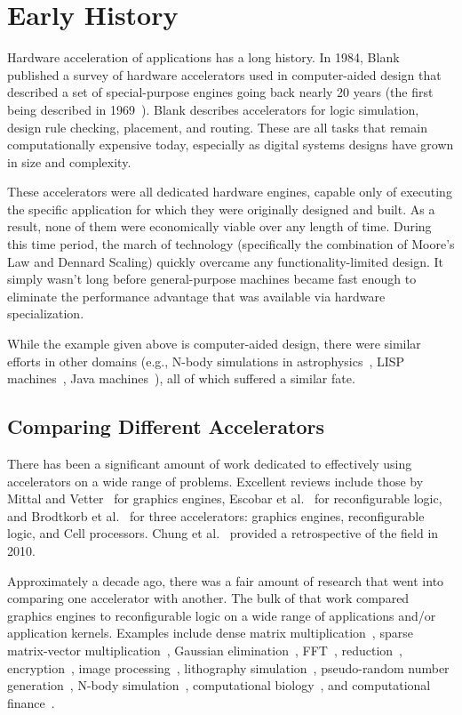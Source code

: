 \section{Early History}
\label{sec:history}

Hardware acceleration of applications has a long history.
In 1984, Blank~\cite{Blank84}
published a survey of hardware accelerators used in computer-aided design 
that described a set of special-purpose engines going back nearly 20 years
(the first being described in 1969~\cite{McKay69}).
Blank describes accelerators for logic simulation, design rule checking,
placement, and routing. These are all tasks that remain computationally
expensive today, especially as digital systems designs have grown in size
and complexity.

These accelerators were all dedicated hardware engines, capable only
of executing the specific application for which they were originally designed
and built. As a result, none of them were economically viable over any
length of time.  During this time period, the march of technology (specifically
the combination of Moore's Law and Dennard Scaling) quickly
overcame any functionality-limited design.  It simply wasn't long
before general-purpose machines became fast enough to eliminate the
performance advantage that was available via hardware specialization.

While the example given above is computer-aided design, there were similar
efforts in other domains (e.g., N-body simulations in
astrophysics~\cite{grapenature,grape},
LISP machines~\cite{lisp,alphalisp},
Java machines~\cite{java,Schoeberl08}),
all of which suffered a similar fate.

\subsection{Comparing Different Accelerators}
\label{sec:compare}

There has been a significant amount of work dedicated to effectively
using accelerators on a wide range of problems.  Excellent reviews
include those by Mittal and Vetter~\cite{mv15} for graphics engines,
Escobar et al.~\cite{ecv16} for reconfigurable logic, and
Brodtkorb et al.~\cite{bdh+10} for three accelerators: graphics engines,
reconfigurable logic, and Cell processors.
Chung et al.~\cite{cmhm10} provided a retrospective of the field in 2010.

Approximately a decade ago, there was a fair amount of research that
went into comparing one accelerator with another.  The bulk of that
work compared graphics engines to reconfigurable logic on a wide range
of applications and/or application kernels.
Examples include dense matrix multiplication~\cite{cmhm10,jpbc10},
sparse matrix-vector multiplication~\cite{sww+10},
Gaussian elimination~\cite{cls+08},
FFT~\cite{cmhm10},
reduction~\cite{jpbc10},
encryption~\cite{cls+08},
image processing~\cite{amy09,bnw+10},
lithography simulation~\cite{cz09},
pseudo-random number generation~\cite{jpbc10,tb09,thl09},
N-body simulation~\cite{jpbc10},
computational biology~\cite{cls+08}, and
computational finance~\cite{cmhm10,tb10}.

